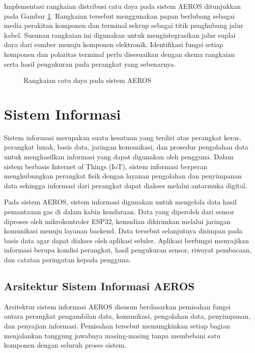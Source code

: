 Implementasi rangkaian distribusi catu daya pada sistem AEROS ditunjukkan pada Gambar \ref{fig:Rangkaian_Catu_Daya_AEROS}. Rangkaian tersebut menggunakan papan berlubang sebagai media perakitan komponen dan terminal sekrup sebagai titik penghubung jalur kabel. Susunan rangkaian ini digunakan untuk mengintegrasikan jalur suplai daya dari sumber menuju komponen elektronik. Identifikasi fungsi setiap komponen dan polaritas terminal perlu disesuaikan dengan skema rangkaian serta hasil pengukuran pada perangkat yang sebenarnya.

\begin{figure}[h!]
    \centering
    \caption{Rangkaian catu daya pada sistem AEROS}
    \label{fig:Rangkaian_Catu_Daya_AEROS}
\end{figure}


\section{Sistem Informasi}
\label{sec:Sistem_Informasi}

Sistem informasi merupakan suatu kesatuan yang terdiri atas perangkat keras, perangkat lunak, basis data, jaringan komunikasi, dan prosedur pengolahan data untuk menghasilkan informasi yang dapat digunakan oleh pengguna. Dalam sistem berbasis Internet of Things (IoT), sistem informasi berperan menghubungkan perangkat fisik dengan layanan pengolahan dan penyimpanan data sehingga informasi dari perangkat dapat diakses melalui antarmuka digital.

Pada sistem AEROS, sistem informasi digunakan untuk mengelola data hasil pemantauan gas di dalam kabin kendaraan. Data yang diperoleh dari sensor diproses oleh mikrokontroler ESP32, kemudian dikirimkan melalui jaringan komunikasi menuju layanan backend. Data tersebut selanjutnya disimpan pada basis data agar dapat diakses oleh aplikasi seluler. Aplikasi berfungsi menyajikan informasi berupa kondisi perangkat, hasil pengukuran sensor, riwayat pembacaan, dan catatan peringatan kepada pengguna.

\subsection{Arsitektur Sistem Informasi AEROS}
\label{subsec:Arsitektur_Sistem_Informasi_AEROS}

Arsitektur sistem informasi AEROS disusun berdasarkan pemisahan fungsi antara perangkat pengambilan data, komunikasi, pengolahan data, penyimpanan, dan penyajian informasi. Pemisahan tersebut memungkinkan setiap bagian menjalankan tanggung jawabnya masing-masing tanpa membebani satu komponen dengan seluruh proses sistem.

